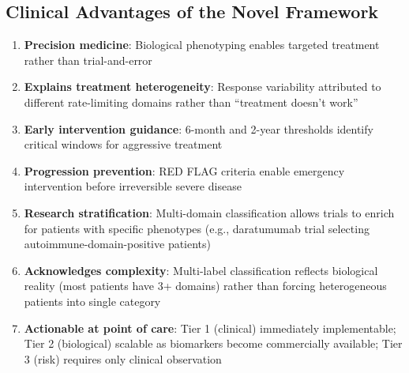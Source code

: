 \subsection{Clinical Advantages of the Novel Framework}
\label{subsec:advantages}

\begin{enumerate}
    \item \textbf{Precision medicine}: Biological phenotyping enables targeted treatment rather than trial-and-error

    \item \textbf{Explains treatment heterogeneity}: Response variability attributed to different rate-limiting domains rather than ``treatment doesn't work''

    \item \textbf{Early intervention guidance}: 6-month and 2-year thresholds identify critical windows for aggressive treatment

    \item \textbf{Progression prevention}: RED FLAG criteria enable emergency intervention before irreversible severe disease

    \item \textbf{Research stratification}: Multi-domain classification allows trials to enrich for patients with specific phenotypes (e.g., daratumumab trial selecting autoimmune-domain-positive patients)

    \item \textbf{Acknowledges complexity}: Multi-label classification reflects biological reality (most patients have 3+ domains) rather than forcing heterogeneous patients into single category

    \item \textbf{Actionable at point of care}: Tier 1 (clinical) immediately implementable; Tier 2 (biological) scalable as biomarkers become commercially available; Tier 3 (risk) requires only clinical observation
\end{enumerate}


